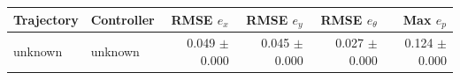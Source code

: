 \begin{tabular}{llrrrr}
\hline
Trajectory & Controller & RMSE $e_x$ & RMSE $e_y$ & RMSE $e_\theta$ & Max $e_p$ \\
\hline
unknown & unknown & 0.049 $\pm$ 0.000 & 0.045 $\pm$ 0.000 & 0.027 $\pm$ 0.000 & 0.124 $\pm$ 0.000 \\
\hline
\end{tabular}
